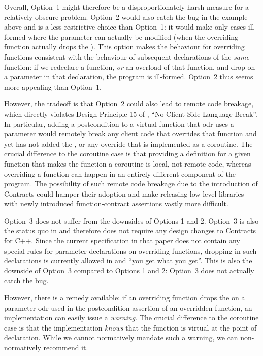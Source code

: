 Overall, Option~1 might therefore be a disproportionately harsh measure for a relatively obscure problem. Option~2 would also catch the bug in the example above and is a less restrictive choice than Option~1: it would make only cases ill-formed where the parameter can actually be modified (when the overriding function actually drops the ). This option makes  the behaviour for overriding functions consistent with the behaviour of subsequent declarations of the \emph{same} function: if we redeclare a function, \emph{or} an overload of that function, and drop  on a parameter in that declaration, the program is ill-formed. Option~2 thus seems more appealing than Option~1.

However, the tradeoff is that Option~2 could also lead to remote code breakage, which directly violates Design Principle 15 of \cite{P2900R10}, ``No Client-Side Language Break''. In particular, adding a postcondition to a virtual function that odr-uses a  parameter would remotely break any client code that overrides that function and yet has not added the , or any override that is implemented as a coroutine. The crucial difference to the coroutine case is that providing a definition for a given function that makes the function a coroutine is local, not remote code, whereas overriding a function can happen in an entirely different component of the program. The possibility of such remote code breakage due to the introduction of Contracts could hamper their adoption and make releasing low-level libraries with newly introduced function-contract assertions vastly more difficult.

Option~3 does not suffer from the downsides of Options 1 and 2. Option~3 is also the status quo in \cite{P2900R10} and therefore does not require any design changes to Contracts for C++. Since the current specification in that paper does not contain any special rules for parameter declarations on overriding functions, dropping  in such declarations is currently allowed in \cite{P2900R10} and ``you get what you get''. This is also the downside of Option~3 compared to Options 1 and 2: Option~3 does not actually catch the bug.

However, there is a remedy available: if an overriding function drops the  on a parameter odr-used in the postcondition assertion of an overridden function, an implementation can easily issue a \emph{warning}. The crucial difference to the coroutine case is that the implementation \emph{knows} that the function is virtual at the point of declaration. While we cannot normatively mandate such a warning, we can non-normatively recommend it.

